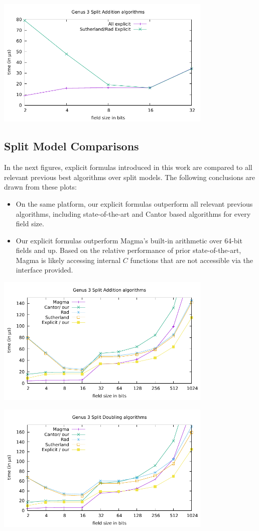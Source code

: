 \centerline{\includegraphics[width=0.775\textwidth]{genus3/g3_G1_ADD.pdf}}

\subsection{Split Model Comparisons}

In the next figures, explicit formulas introduced in this work are compared to
all relevant previous best algorithms over split models. The following
conclusions are drawn from these plots:
\begin{itemize}
    \item On the same platform, our explicit formulas outperform all relevant
    previous algorithms, including state-of-the-art and Cantor based algorithms
    for every field size.
     
    \item Our explicit formulas outperform Magma's built-in arithmetic over
    64-bit fields and up. Based on the relative performance of prior
    state-of-the-art, Magma is likely accessing internal $C$ functions that are
    not accessible via the interface provided.
\end{itemize}

\centerline{\includegraphics[width=0.775\textwidth]{genus3/g3_G2_ADD.pdf}}
\centerline{\includegraphics[width=0.775\textwidth]{genus3/g3_G2_DBL.pdf}}




